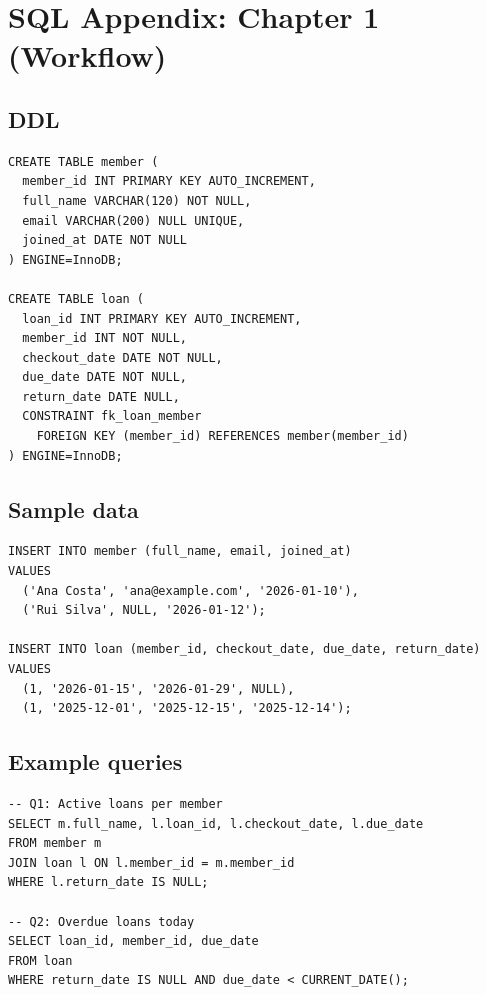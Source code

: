 \chapter{SQL Appendix: Chapter 1 (Workflow)}

\section{DDL}
\begin{verbatim}
CREATE TABLE member (
  member_id INT PRIMARY KEY AUTO_INCREMENT,
  full_name VARCHAR(120) NOT NULL,
  email VARCHAR(200) NULL UNIQUE,
  joined_at DATE NOT NULL
) ENGINE=InnoDB;

CREATE TABLE loan (
  loan_id INT PRIMARY KEY AUTO_INCREMENT,
  member_id INT NOT NULL,
  checkout_date DATE NOT NULL,
  due_date DATE NOT NULL,
  return_date DATE NULL,
  CONSTRAINT fk_loan_member
    FOREIGN KEY (member_id) REFERENCES member(member_id)
) ENGINE=InnoDB;
\end{verbatim}

\section{Sample data}
\begin{verbatim}
INSERT INTO member (full_name, email, joined_at)
VALUES
  ('Ana Costa', 'ana@example.com', '2026-01-10'),
  ('Rui Silva', NULL, '2026-01-12');

INSERT INTO loan (member_id, checkout_date, due_date, return_date)
VALUES
  (1, '2026-01-15', '2026-01-29', NULL),
  (1, '2025-12-01', '2025-12-15', '2025-12-14');
\end{verbatim}

\section{Example queries}
\begin{verbatim}
-- Q1: Active loans per member
SELECT m.full_name, l.loan_id, l.checkout_date, l.due_date
FROM member m
JOIN loan l ON l.member_id = m.member_id
WHERE l.return_date IS NULL;

-- Q2: Overdue loans today
SELECT loan_id, member_id, due_date
FROM loan
WHERE return_date IS NULL AND due_date < CURRENT_DATE();
\end{verbatim}
